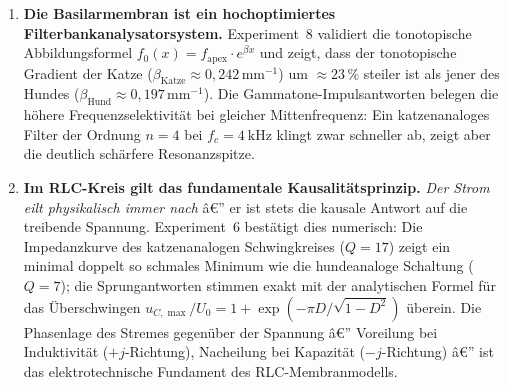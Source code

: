 ﻿\documentclass[12pt,a4paper,titlepage]{report}
\begin{document}
\begin{enumerate}[leftmargin=2em, label=\textbf{\arabic{enumi}.}]
	\item \textbf{Die Basilarmembran ist ein hochoptimiertes Filterbankanalysatorsystem.}
		Experiment~8 validiert die tonotopische Abbildungsformel
		$f_0(x)=f_{\mathrm{apex}}\cdot e^{\beta x}$ und zeigt,
		dass der tonotopische Gradient der Katze
		($\beta_{\mathrm{Katze}}\approx0{,}242\,\mathrm{mm}^{-1}$)
		um $\approx23\,\%$ steiler ist als jener des Hundes
		($\beta_{\mathrm{Hund}}\approx0{,}197\,\mathrm{mm}^{-1}$).
		Die Gammatone-Impulsantworten belegen die höhere Frequenzselektivität
		bei gleicher Mittenfrequenz: Ein katzenanaloges Filter der
		Ordnung $n=4$ bei $f_c=\SI{4}{\kilo\hertz}$ klingt zwar schneller ab,
		zeigt aber die deutlich schärfere Resonanzspitze.

	\item \textbf{Im RLC-Kreis gilt das fundamentale Kausalitätsprinzip.}
		\emph{Der Strom eilt physikalisch immer nach} â€” er ist stets
		die kausale Antwort auf die treibende Spannung.
		Experiment~6 bestätigt dies numerisch: Die Impedanzkurve
		des katzenanalogen Schwingkreises ($Q=17$) zeigt ein
		minimal doppelt so schmales Minimum wie die hunde\-analoge
		Schaltung ($Q=7$); die Sprungantworten stimmen exakt mit
		der analytischen Formel für das Überschwingen
		$u_{C,\max}/U_0=1+\exp(-\pi D/\sqrt{1-D^2})$ überein.
		Die Phasenlage des Stremes gegenüber der Spannung â€”
		Voreilung bei Induktivität ($+j$-Richtung), Nacheilung bei
		Kapazität ($-j$-Richtung) â€” ist das elektrotechnische
		Fundament des RLC-Membranmodells.


\end{enumerate}
\end{document}
